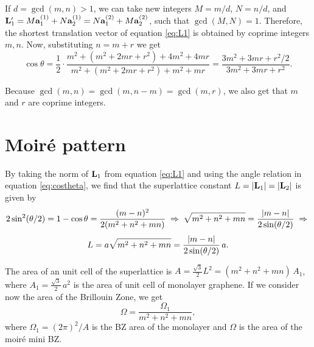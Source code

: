 If $d = \gcd(m, n) > 1$, we can take new integers $M = m/d$, $N = n/d$, and $\vb{L}_1' = M\vb{a}_1^{(1)} + N\vb{a}_2^{(1)} = N\vb{a}_1^{(2)} + M\vb{a}_2^{(2)}$, such that $\gcd(M, N) = 1$. Therefore, the shortest translation vector of equation \ref{eq:L1} is obtained by coprime integers $m, n$. Now, substituting $n = m + r$ we get
\begin{equation} \label{eq:costheta-r}
\boxed{\cos\theta = \frac{1}{2} \cdot \frac{m^2 + (m^2 + 2mr + r^2) + 4m^2 + 4mr}{m^2 + (m^2 + 2mr + r^2) + m^2 + mr} =
\frac{3 m^2 + 3mr + r^2/2}{3m^2 + 3mr + r^2}. }
\end{equation}

Because $\gcd(m, n) = \gcd(m, n-m) = \gcd(m, r)$, we also get that $m$ and $r$ are coprime integers.

\n



\pagebreak

\section{Moiré pattern}

By taking the norm of $\vb{L}_1$ from equation \ref{eq:L1} and using the angle relation in equation \ref{eq:costheta}, we find that the superlattice constant $L = \abs{\vb{L}_1} = \abs{\vb{L}_2}$ is given by
$$
2\sin[2](\theta/2) = 1 - \cos\theta = \frac{(m-n)^2}{2(m^2+n^2+mn)} \; \Rightarrow \;
\sqrt{m^2+n^2+mn} = \frac{\abs{m-n}}{2\sin(\theta/2)} \; \Rightarrow \;
$$
\begin{equation} \label{eq:L-commensurate}
L = a\sqrt{m^2 + n^2 + mn} = \frac{\abs{m-n}}{2 \sin(\theta/2)} \, a.
\end{equation}

\n


The area of an unit cell of the superlattice is $A = \frac{\sqrt{3}}{2} L^2 = (m^2 + n^2 + mn) \, A_1$, where $A_1 = \frac{\sqrt{3}}{2} \, a^2$ is the area of unit cell of monolayer graphene. If we consider now the area of the Brillouin Zone, we get
\begin{equation} \label{eq:bz-volume}
\Omega = \frac{\Omega_1}{m^2 + n^2 + mn},
\end{equation}
where $\Omega_1 = (2\pi)^2/A$ is the BZ area of the monolayer and $\Omega$ is the area of the moiré mini BZ.


